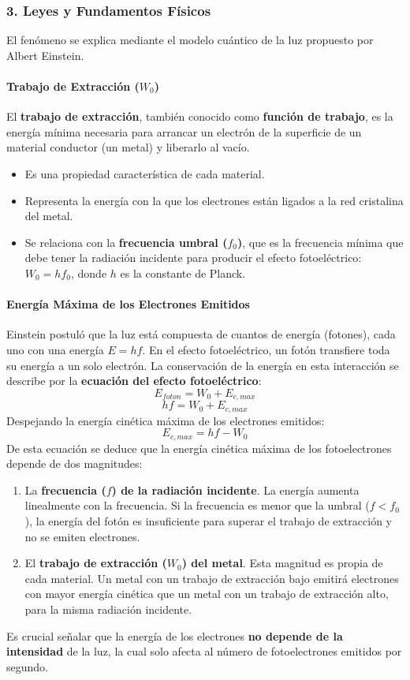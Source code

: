 \subsubsection*{3. Leyes y Fundamentos Físicos}
El fenómeno se explica mediante el modelo cuántico de la luz propuesto por Albert Einstein.
\paragraph{Trabajo de Extracción ($W_0$)}
El \textbf{trabajo de extracción}, también conocido como \textbf{función de trabajo}, es la energía mínima necesaria para arrancar un electrón de la superficie de un material conductor (un metal) y liberarlo al vacío.
\begin{itemize}
    \item Es una propiedad característica de cada material.
    \item Representa la energía con la que los electrones están ligados a la red cristalina del metal.
    \item Se relaciona con la \textbf{frecuencia umbral ($f_0$)}, que es la frecuencia mínima que debe tener la radiación incidente para producir el efecto fotoeléctrico: $W_0 = h f_0$, donde $h$ es la constante de Planck.
\end{itemize}

\paragraph{Energía Máxima de los Electrones Emitidos}
Einstein postuló que la luz está compuesta de cuantos de energía (fotones), cada uno con una energía $E = hf$. En el efecto fotoeléctrico, un fotón transfiere toda su energía a un solo electrón. La conservación de la energía en esta interacción se describe por la \textbf{ecuación del efecto fotoeléctrico}:
$$ E_{foton} = W_0 + E_{c,max} $$
$$ hf = W_0 + E_{c,max} $$
Despejando la energía cinética máxima de los electrones emitidos:
$$ E_{c,max} = hf - W_0 $$
De esta ecuación se deduce que la energía cinética máxima de los fotoelectrones depende de dos magnitudes:
\begin{enumerate}
    \item La \textbf{frecuencia ($f$) de la radiación incidente}. La energía aumenta linealmente con la frecuencia. Si la frecuencia es menor que la umbral ($f<f_0$), la energía del fotón es insuficiente para superar el trabajo de extracción y no se emiten electrones.
    \item El \textbf{trabajo de extracción ($W_0$) del metal}. Esta magnitud es propia de cada material. Un metal con un trabajo de extracción bajo emitirá electrones con mayor energía cinética que un metal con un trabajo de extracción alto, para la misma radiación incidente.
\end{enumerate}
Es crucial señalar que la energía de los electrones \textbf{no depende de la intensidad} de la luz, la cual solo afecta al número de fotoelectrones emitidos por segundo.

